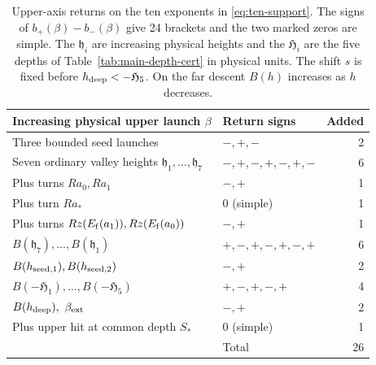 \begin{table}[htbp]
\centering\small
\caption{Upper-axis returns on the ten exponents in \eqref{eq:ten-support}.
The signs of $b_+(\beta)-b_-(\beta)$ give 24 brackets and the two
marked zeros are simple. The $\mathfrak h_i$ are increasing physical
heights and the $\mathfrak H_i$ are the five depths of
Table~\ref{tab:main-depth-cert} in physical units. The shift $s$ is
fixed before $h_{\rm deep}<-\mathfrak H_5$. On the far descent
$B(h)$ increases as $h$ decreases.}\label{tab:ordered-returns}
\begin{tabular}{@{}llr@{}}
\toprule
Increasing physical upper launch $\beta$ & Return signs & Added\\
\midrule
Three bounded seed launches & $-,+,-$ & 2\\
Seven ordinary valley heights $\mathfrak h_1,\ldots,\mathfrak h_7$ & $-,+,-,+,-,+,-$ & 6\\
Plus turns $Ra_0,Ra_1$ & $-,+$ & 1\\
Plus turn $Ra_*$ & $0$ (simple) & 1\\
Plus turns $Rz(E_{\rm f}(a_1)),Rz(E_{\rm f}(a_0))$ & $-,+$ & 1\\
$B(\mathfrak h_7),\ldots,B(\mathfrak h_1)$ & $+,-,+,-,+,-,+$ & 6\\
$B(h_{\rm seed,1}),B(h_{\rm seed,2})$ & $-,+$ & 2\\
$B(-\mathfrak H_1),\ldots,B(-\mathfrak H_5)$ & $+,-,+,-,+$ & 4\\
$B(h_{\rm deep}),\ \beta_{\rm ext}$ & $-,+$ & 2\\
Plus upper hit at common depth $S_*$ & $0$ (simple) & 1\\
\midrule
 & Total & 26\\
\bottomrule
\end{tabular}
\end{table}
